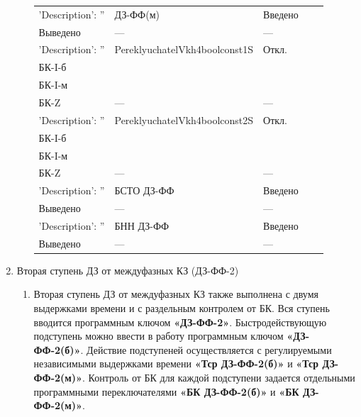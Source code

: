 \begin{enumerate}[label=\arabic{section}.\arabic{subsection}.\arabic{enumi}, labelsep=4pt, leftmargin=0pt, itemindent=57pt, itemsep=0pt, parsep=5pt]
\begin{enumerate}[label=\arabic{section}.\arabic{subsection}.\arabic{enumi}.\arabic*, labelsep=4pt, leftmargin=0em, itemindent=65pt, parsep=0pt]
\begin{longtable}{|>{\centering\arraybackslash}m{5.3cm}|>{\centering\arraybackslash}m{3.3cm}|>{\centering\arraybackslash}m{4.2cm}|>{\centering\arraybackslash}m{1.8cm}|>{\centering\arraybackslash}m{1cm}|}
\hline
\raggedright {'Description': ''} & \centering ДЗ-ФФ(м) & \centering Введено \\ Выведено & \centering --- & \centering \arraybackslash --- \\
\hline
\raggedright {'Description': ''} & \centering PereklyuchatelVkh4boolconst1S & \centering Откл. \\ БК-I-б \\ БК-I-м \\ БК-Z & \centering --- & \centering \arraybackslash --- \\
\hline
\raggedright {'Description': ''} & \centering PereklyuchatelVkh4boolconst2S & \centering Откл. \\ БК-I-б \\ БК-I-м \\ БК-Z & \centering --- & \centering \arraybackslash --- \\
\hline
\raggedright {'Description': ''} & \centering БСТО ДЗ-ФФ & \centering Введено \\ Выведено & \centering --- & \centering \arraybackslash --- \\
\hline
\raggedright {'Description': ''} & \centering БНН ДЗ-ФФ & \centering Введено \\ Выведено & \centering --- & \centering \arraybackslash --- \\
\hline
\end{longtable}
\normalsize

\end{enumerate}


\item\label{sec:sec2} Вторая ступень ДЗ от междуфазных КЗ (ДЗ-ФФ-2)
\begin{enumerate}[label=\arabic{section}.\arabic{subsection}.\arabic{enumi}.\arabic*, labelsep=4pt, leftmargin=0em, itemindent=65pt, parsep=0pt]

\item
Вторая ступень ДЗ от междуфазных КЗ также выполнена с двумя выдержками времени и с раздельным контролем от БК. Вся ступень вводится программным ключом \textbf{«ДЗ-ФФ-2»}. Быстродействующую подступень можно  ввести  в  работу  программным  ключом  \textbf{«ДЗ-ФФ-2(б)»}.  Действие  подступеней  осуществляется  с регулируемыми независимыми выдержками времени \textbf{«Тср ДЗ-ФФ-2(б)»} и \textbf{«Тср ДЗ-ФФ-2(м)»}. Контроль от БК для каждой подступени задается отдельными программными переключателями \textbf{«БК ДЗ-ФФ-2(б)»} и \textbf{«БК ДЗ-ФФ-2(м)»}.


\end{enumerate}
\end{enumerate}
